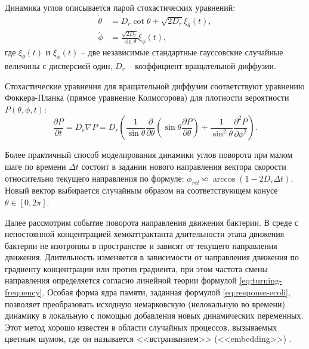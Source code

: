 Динамика углов описывается парой стохастических уравнений:
\begin{equation}
    \begin{aligned}
	\dot{\theta} &= D_r\cot\theta +\sqrt{2D_r}\xi_{\theta}(t),\\
	\dot{\phi} &= \frac{\sqrt{2D_r}}{\sin\theta}\xi_{\phi}(t),
    \end{aligned}
    \label{eq:bacteria-angle-equations}
\end{equation}
где $\xi_{\theta}(t)$ и $\xi_{\phi}(t)$ -- две независимые стандартные гауссовские случайные величины с дисперсией один, $D_r$ -- коэффициент вращательной диффузии.

Стохастические уравнения для вращательной диффузии соответствуют уравнению Фоккера-Планка (прямое уравнение Колмогорова) для плотности вероятности $P(\theta,\phi,t)$:
\begin{equation}
	\frac{\partial P}{\partial t} = D_r \nabla P = 
	D_r \left ( \frac{1}{\sin \theta}\frac{\partial}{\partial \theta} \left (\sin\theta \frac{\partial P}{\partial \theta}\right ) + \frac{1}{\sin^2 \theta}\frac{\partial^2 P}{\partial \phi^2}\right ).
    \label{eq:foker-planck-angle-dynamics}
\end{equation}

Более практичный способ моделирования динамики углов поворота при малом шаге по времени $\Delta t$ состоит в задании нового направления вектора скорости относительно текущего направления по формуле: $\phi_{rel} \backsimeq \arccos{(1 - 2 D_r \Delta t)}$. Новый вектор выбирается случайным образом на соответствующем конусе $\theta \in [0, 2\pi]$.

Далее рассмотрим событие поворота направления движения бактерии. В среде с непостоянной концентрацией хемоаттрактанта длительности этапа движения бактерии не изотропны в пространстве и зависят от текущего направления движения. Длительность изменяется в зависимости от направления движения по градиенту концентрации или против градиента, при этом частота смены направления определяется согласно линейной теории формулой \cref{eq:turning-frequency}. Особая форма ядра памяти, заданная формулой \cref{eq:response-ecoli}, позволяет преобразовать исходную немарковскую (нелокальную во времени) динамику в локальную с помощью добавления новых динамических переменных. Этот метод хорошо известен в области случайных процессов, вызываемых цветным шумом, где он называется <<встраиванием>> (<<embedding>>) \cite{xie_marine_2015,grabert_microdynamics_1977}.

